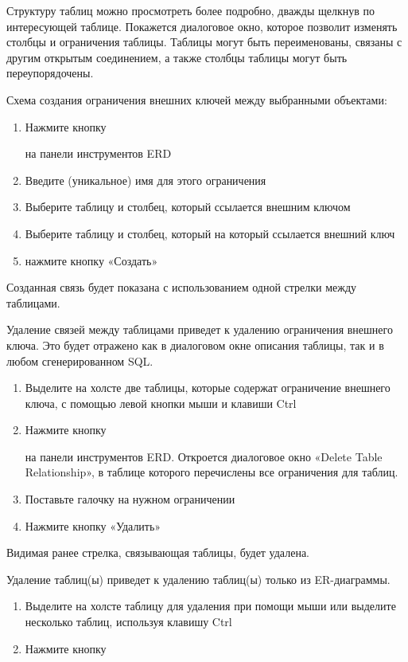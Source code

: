 Структуру таблиц можно просмотреть более подробно, дважды щелкнув по интересующей таблице. Покажется диалоговое окно, которое позволит изменять столбцы и ограничения таблицы. Таблицы могут быть переименованы, связаны с другим открытым соединением, а также столбцы таблицы могут быть переупорядочены.


Схема создания ограничения внешних ключей между выбранными объектами:
\begin{enumerate}
	\item Нажмите кнопку 
	на панели инструментов ERD
	\item Введите (уникальное) имя для этого ограничения
	\item Выберите таблицу и столбец, который ссылается внешним ключом
	\item Выберите таблицу и столбец, который на который ссылается внешний ключ
	\item нажмите кнопку «Создать»
\end{enumerate}
Созданная связь будет показана с использованием одной стрелки между таблицами.

Удаление связей между таблицами приведет к удалению ограничения внешнего ключа. Это будет отражено как в диалоговом окне описания таблицы, так и в любом сгенерированном SQL.
\begin{enumerate}
	\item Выделите на холсте две таблицы, которые содержат ограничение внешнего ключа, с помощью левой кнопки мыши и клавиши Ctrl
	\item Нажмите кнопку 
	на панели инструментов ERD. Откроется диалоговое окно «Delete Table Relationship», в таблице которого перечислены все ограничения для таблиц. 
	\item Поставьте галочку на нужном ограничении
	\item Нажмите кнопку «Удалить»
\end{enumerate}
Видимая ранее стрелка, связывающая таблицы, будет удалена.

Удаление таблиц(ы) приведет к удалению таблиц(ы) только из ER-диаграммы.
\begin{enumerate}
	\item Выделите на холсте таблицу для удаления при помощи мыши или выделите несколько таблиц, используя клавишу Ctrl
	\item Нажмите кнопку 
\end{enumerate}

